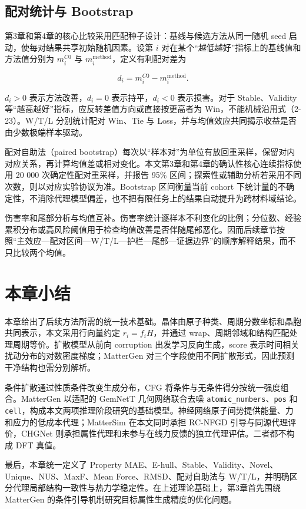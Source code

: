 \subsection{配对统计与 Bootstrap}

第3章和第4章的核心比较采用匹配种子设计：基线与候选方法从同一随机 seed 启动，使每对结果共享初始随机因素。设第 \(i\) 对在某个``越低越好''指标上的基线值和方法值分别为 \(m_i^{C0}\) 与 \(m_i^{\mathrm{method}}\)，定义有利配对差为

\[
d_i=m_i^{C0}-m_i^{\mathrm{method}}.
\tag{2-23}
\]

\(d_i>0\) 表示方法改善，\(d_i=0\) 表示持平，\(d_i<0\) 表示损害。对于 Stable、Validity 等``越高越好''指标，应反转差值方向或直接按更高者为 Win，不能机械沿用式（2-23）。W/T/L 分别统计配对 Win、Tie 与 Loss，并与均值效应共同揭示收益是否由少数极端样本驱动。

配对自助法（paired bootstrap）每次以``样本对''为单位有放回重采样，保留对内对应关系，再计算均值差或相对变化。本文第3章和第4章的确认性核心连续指标使用 20 000 次确定性配对重采样，并报告 95\% 区间；探索性或辅助分析若采用不同次数，则以对应实验协议为准。Bootstrap 区间衡量当前 cohort 下统计量的不确定性，不消除代理模型偏差，也不把有限任务上的结果自动提升为跨材料域结论。

伤害率和尾部分析与均值互补。伤害率统计逐样本不利变化的比例；分位数、经验累积分布或高风险阈值用于检查均值改善是否伴随尾部恶化。因而后续章节按照``主效应---配对区间---W/T/L---护栏---尾部---证据边界''的顺序解释结果，而不只比较两个均值。

\section{本章小结}

本章给出了后续方法所需的统一技术基础。晶体由原子种类、周期分数坐标和晶胞共同表示，本文采用行向量约定 \(r_i=f_iH\)，并通过 wrap、周期邻域和结构匹配处理周期等价。扩散模型从前向 corruption 出发学习反向生成，score 表示时间相关扰动分布的对数密度梯度；MatterGen 对三个字段使用不同扩散形式，因此预测干净结构也需分别解析。

条件扩散通过性质条件改变生成分布，CFG 将条件与无条件得分按统一强度组合。MatterGen 以适配的 GemNetT 几何网络联合去噪 \texttt{atomic\_numbers}、\texttt{pos} 和 \texttt{cell}，构成本文两项推理阶段研究的基础模型。神经网络原子间势提供能量、力和应力的低成本代理；Matter\allowbreak Sim 在本文同时承担 RC-NFGD 引导与同源代理评价，CHGNet 则承担属性代理和未参与在线力反馈的独立代理评估。二者都不构成 DFT 真值。

最后，本章统一定义了 Property MAE、E-hull、Stable、Validity、Novel、Unique、NUS、MaxF、Mean Force、RMSD、配对自助法与 W/T/L，并明确区分代理局部结构一致性与热力学稳定性。在上述理论基础上，第3章首先围绕 MatterGen 的条件引导机制研究目标属性生成精度的优化问题。
